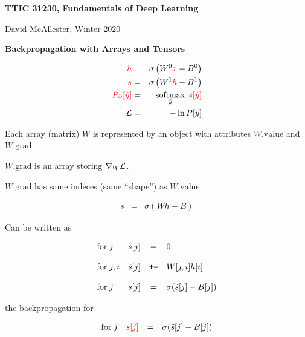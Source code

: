 




{\Huge
  
  \centerline{\bf TTIC 31230, Fundamentals of Deep Learning}
  \bigskip
  \centerline{David McAllester, Winter 2020}
  \vfill
  \vfill
  \centerline{\bf Backpropagation with Arrays and Tensors}
  \vfill
  \vfill


\begin{eqnarray*}
  {\color{red} h} & = & \sigma\left(W^0{\color{red} x} - B^0\right) \\
  {\color{red} s} & = & \sigma\left(W^1{\color{red} h} - B^1 \right) \\
  {\color{red} P_\Phi[\hat{y}]} & = & \operatorname*{softmax}_{\hat{y}}\;{\color{red} s[\hat{y}]} \\
  {\cal L} & = & - \ln P[y]
\end{eqnarray*}

\vfill
Each array (matrix) {\color{red} $W$} is represented by an object with attributes
{\color{red} $W.\mathrm{value}$} and {\color{red} $W.\mathrm{grad}$}.

\vfill
{\color{red} $W.\mathrm{grad}$} is an array storing {\color{red} $\nabla_W{\cal L}$}.

\vfill
{\color{red} $W.\mathrm{grad}$} has same indeces (same ``shape'') as {\color{red} $W.\mathrm{value}$}.


\begin{eqnarray*}
   s & = & \sigma\left(Wh - B \right)
\end{eqnarray*}

\vfill
Can be written as

\vfill
$$\begin{array}{lrcl}
\mathrm{for}\;j &  \tilde{s}[j] & = & 0 \\
\\
\mathrm{for}\;j,i &  \tilde{s}[j] & \mbox{\tt +=} &  W[j,i]h[i] \\
\\
\mathrm{for}\; j & s[j] & = & \sigma(\tilde{s}[j] - B[j])
\end{array}$$

the backpropagation for

$$\begin{array}{lrcl}
\mathrm{for}\;j & {\color{red} s[j]} & = & \sigma(\tilde{s}[j] - B[j])
\end{array}$$

}
